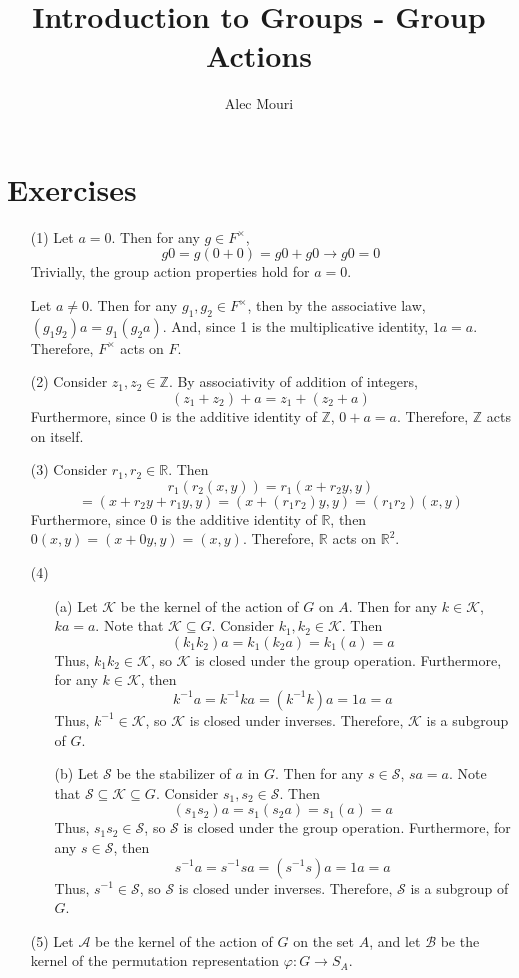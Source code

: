 \documentclass[12pt]{article}
\begin{document}
\title{Introduction to Groups - Group Actions}
\author{Alec Mouri}

\maketitle
\section*{Exercises}
\begin{itemize}
\item[(1)]
Let $a = 0$. Then for any $g \in F^\times$,
$$g0 = g(0 + 0) = g0 + g0 \rightarrow g0 = 0$$
Trivially, the group action properties hold for $a = 0$.

Let $a \neq 0$. Then for any $g_1, g_2 \in F^\times$, then by the associative law, $(g_1g_2)a = g_1(g_2a)$. And, since 1 is the multiplicative identity, $1a = a$. Therefore, $F^\times$ acts on $F$.
\item[(2)]
Consider $z_1, z_2 \in \mathbb{Z}$. By associativity of addition of integers,
$$(z_1 + z_2) + a = z_1 + (z_2 + a)$$
Furthermore, since 0 is the additive identity of $\mathbb{Z}$, $0 + a = a$. Therefore, $\mathbb{Z}$ acts on itself.
\item[(3)]
Consider $r_1, r_2 \in \mathbb{R}$. Then
$$r_1(r_2(x, y)) = r_1(x + r_2y, y)$$
$$ = (x + r_2y + r_1y, y) = (x + (r_1r_2)y, y) = (r_1r_2)(x, y)$$
Furthermore, since 0 is the additive identity of $\mathbb{R}$, then $0(x, y) = (x + 0y, y) = (x, y)$. Therefore, $\mathbb{R}$ acts on $\mathbb{R}^2$.
\item[(4)]
\begin{itemize}
\item[(a)]
Let $\mathcal{K}$ be the kernel of the action of $G$ on $A$. Then for any $k \in \mathcal{K}$, $ka = a$. Note that $\mathcal{K} \subseteq G$. Consider $k_1, k_2 \in \mathcal{K}$. Then
$$(k_1k_2)a = k_1(k_2a) = k_1(a) = a$$
Thus, $k_1k_2 \in \mathcal{K}$, so $\mathcal{K}$ is closed under the group operation. Furthermore, for any $k \in \mathcal{K}$, then
$$k^{-1}a = k^{-1}ka = (k^{-1}k)a = 1a = a$$
Thus, $k^{-1} \in \mathcal{K}$, so $\mathcal{K}$ is closed under inverses. Therefore, $\mathcal{K}$ is a subgroup of $G$.
\item[(b)]
Let $\mathcal{S}$ be the stabilizer of $a$ in $G$. Then for any $s \in \mathcal{S}$, $sa = a$. Note that $\mathcal{S} \subseteq \mathcal{K} \subseteq G$. Consider $s_1, s_2 \in \mathcal{S}$. Then
$$(s_1s_2)a = s_1(s_2a) = s_1(a) = a$$
Thus, $s_1s_2 \in \mathcal{S}$, so $\mathcal{S}$ is closed under the group operation. Furthermore, for any $s \in \mathcal{S}$, then
$$s^{-1}a = s^{-1}sa = (s^{-1}s)a = 1a = a$$
Thus, $s^{-1} \in \mathcal{S}$, so $\mathcal{S}$ is closed under inverses. Therefore, $\mathcal{S}$ is a subgroup of $G$.
\end{itemize}
\item[(5)]
Let $\mathcal{A}$ be the kernel of the action of $G$ on the set $A$, and let $\mathcal{B}$ be the kernel of the permutation representation $\varphi: G \rightarrow S_A$.


\end{itemize}
\end{document}
